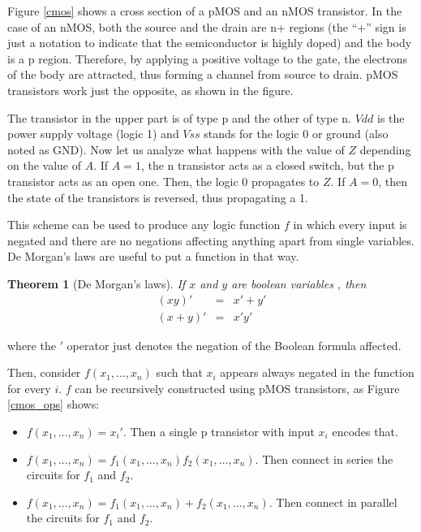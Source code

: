 \documentclass{fmetfm}
\newtheorem{theorem}{{Theorem}}
\begin{document}
Figure \ref{cmos} shows a cross section of a pMOS and an nMOS transistor. In the case of an nMOS, both the source and the drain are n+ regions (the ``+'' sign is just a notation to indicate that the semiconductor is highly doped) and the body is a p region. Therefore, by applying a positive voltage to the gate, the electrons of the body are attracted, thus forming a channel from source to drain. pMOS transistors work just the opposite, as shown in the figure.

The transistor in the upper part is of type p and the other of type n. $Vdd$ is the  power supply voltage (logic 1) and $Vss$ stands for the logic 0 or ground (also noted as GND). Now let us analyze what happens with the value of $Z$ depending on the value of $A$. If $A = 1$, the n transistor acts as a closed switch, but the p transistor acts as an open one. Then, the logic 0 propagates to $Z$. If $A = 0$, then the state of the transistors is reversed, thus propagating a 1.

This scheme can be used to produce any logic function $f$ in which every input is negated and there are no negations affecting anything apart from single variables. De Morgan's laws are useful to put a function in that way. 

\begin{theorem}[De Morgan's laws] If $x$ and $y$ are boolean variables , then
\begin{eqnarray*}
(xy)' &=& x' + y'\\
(x + y)' &=& x'y'
\end{eqnarray*}
\end{theorem}

where the $'$ operator just denotes the negation of the Boolean formula affected.

Then, consider $f(x_1, \dots, x_n)$ such that $x_i$ appears always negated in the function for every $i$. $f$ can be recursively constructed using pMOS transistors, as Figure \ref{cmos_ops} shows:

\begin{itemize}
\item $f(x_1, \dots, x_n) = x_i'$. Then a single p transistor with input $x_i$ encodes that.
\item $f(x_1, \dots, x_n) = f_1(x_1, \dots, x_n)f_2(x_1, \dots, x_n)$. Then connect in series the circuits for $f_1$ and $f_2$.
\item $f(x_1, \dots, x_n) = f_1(x_1, \dots, x_n) + f_2(x_1, \dots, x_n)$. Then connect in parallel the circuits for $f_1$ and $f_2$.
\end{itemize}
\end{document}
